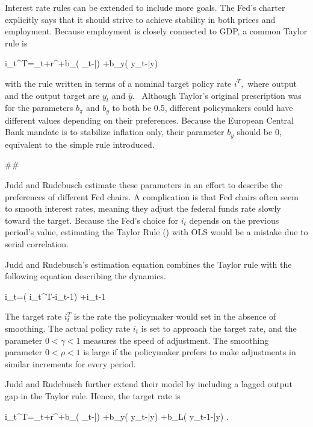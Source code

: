 ﻿\documentclass[oneside]{book}
\begin{document}
Interest rate rules can be extended to include more goals. The Fed's
charter explicitly says that it should strive to achieve stability in both prices and employment. Because employment is closely connected to GDP, a
common Taylor rule is



i_{t}^{T}=\pi _{t}+r^{\ast }+b_{\pi }( \pi _{t}-\bar{\pi})
+b_{y}( y_{t}-\bar{y})


with the rule written in terms of a nominal target policy rate $i^{T},$ where
output and the output target are $y_{t}$ and $\bar{y}$. \
Although Taylor's original prescription was for the parameters $b_{\pi }$ and $b_{y}$ to both be 0.5, different policymakers could have different
values depending on their preferences. Because the European Central Bank mandate is to stabilize inflation only, their parameter $b_{y}$ should be 0, equivalent to the simple rule introduced.



##



Judd and Rudebusch  estimate these parameters in an effort to describe the preferences of different Fed chairs. A complication is that Fed chairs often seem to smooth interest rates, meaning they
adjust the federal funds rate slowly toward the target. Because the Fed's choice for $i_{t}$ depends on the previous period's value, estimating the Taylor
Rule () with OLS would be a mistake due to serial correlation.

Judd and Rudebusch's estimation equation combines the Taylor rule with the following equation describing the dynamics.



\Delta i_{t}=\gamma ( i_{t}^{T}-i_{t-1}) +\rho \Delta i_{t-1}


The target rate $i_{t}^{T}$ is the rate the policymaker would set in the
absence of smoothing. The actual policy rate $i_{t}$ is set to approach
the target rate, and the parameter $0<\gamma <1$ measures the speed of
adjustment. The smoothing parameter $0<\rho <1$ is large if the policymaker prefers to make adjustments in similar increments for every period.

Judd and Rudebusch further extend their model by including a lagged output gap in the Taylor rule. Hence, the target rate is



i_{t}^{T}=\pi _{t}+r^{\ast }+b_{\pi }( \pi _{t}-\bar{\pi})
+b_{y}( y_{t}-\bar{y}) +b_{L}( y_{t-1}-\bar{y}) .
\end{document}
